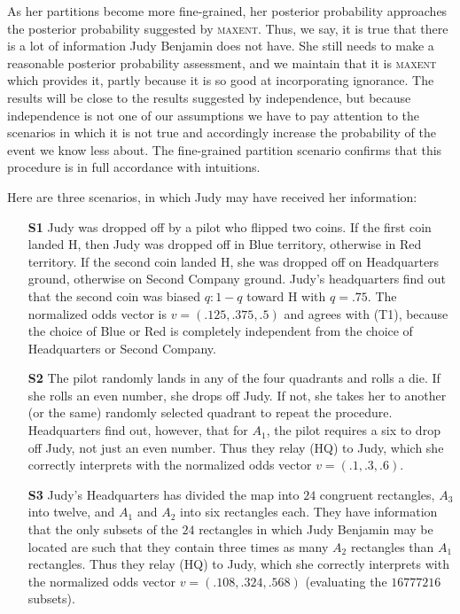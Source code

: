 \documentclass[11pt]{article}
\begin{document}
As her partitions become more fine-grained, her posterior probability
approaches the posterior probability suggested by \textsc{maxent}.
Thus, we say, it is true that there is a lot of information Judy
Benjamin does not have. She still needs to make a reasonable posterior
probability assessment, and we maintain that it is \textsc{maxent}
which provides it, partly because it is so good at incorporating
ignorance. The results will be close to the results suggested by
independence, but because independence is not one of our assumptions
we have to pay attention to the scenarios in which it is not true and
accordingly increase the probability of the event we know less about.
The fine-grained partition scenario confirms that this procedure is in
full accordance with intuitions.

Here are three scenarios, in which Judy may have received her
information:

\begin{enumerate}
\item[\textbf{S1}] Judy was dropped off by a pilot who flipped two coins. If
  the first coin landed H, then Judy was dropped off in Blue
  territory, otherwise in Red territory. If the second coin landed H,
  she was dropped off on Headquarters ground, otherwise on Second
  Company ground. Judy's headquarters find out that the second coin
  was biased $q:1-q$ toward H with $q=.75$. The normalized odds vector is
  $v=(.125,.375,.5)$ and agrees with (T1), because the choice of Blue
  or Red is completely independent from the choice of Headquarters or
  Second Company.
\item[\textbf{S2}] The pilot randomly lands in any of the four quadrants and
  rolls a die. If she rolls an even number, she drops off Judy. If
  not, she takes her to another (or the same) randomly selected
  quadrant to repeat the procedure. Headquarters find out, however,
  that for $A_{1}$, the pilot requires a six to drop off Judy, not
  just an even number. Thus they relay (HQ) to Judy, which she
  correctly interprets with the normalized odds vector $v=(.1,.3,.6)$.
\item[\textbf{S3}] Judy's Headquarters has divided the map into $24$ congruent
  rectangles, $A_{3}$ into twelve, and $A_{1}$ and $A_{2}$ into six
  rectangles each. They have information that the only subsets of the
  $24$ rectangles in which Judy Benjamin may be located are such that
  they contain three times as many $A_{2}$ rectangles than $A_{1}$
  rectangles. Thus they relay (HQ) to Judy, which she correctly
  interprets with the normalized odds vector $v=(.108,.324,.568)$
  (evaluating the $16777216$ subsets).
\end{enumerate}
\end{document}
